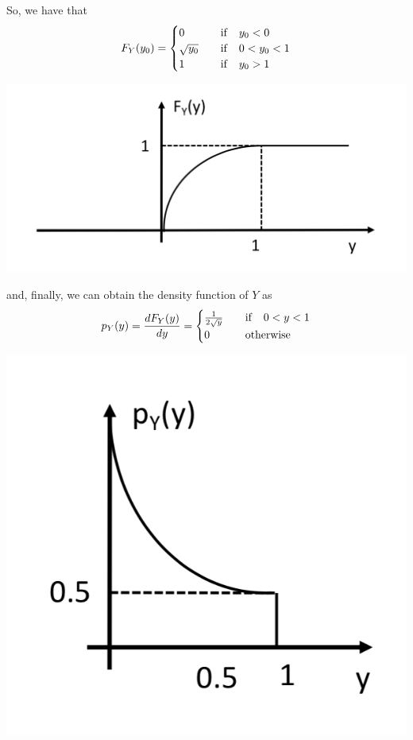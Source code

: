 So, we have that
\begin{eqnarray} 
F_Y(y_0) =\begin{cases}
 0 & \quad {\rm if} \quad y_0 <0 \\
 \sqrt{y_0} & \quad {\rm if} \quad 0< y_0 <1 \\
 1 & \quad {\rm if} \quad y_0 >1 \\
\end{cases}  \nonumber
\end{eqnarray} 
\begin{center}
\includegraphics[scale=.4]{Figures/Fig13.png}
\end{center}
and, finally, we can obtain the density function of $Y$ as
\begin{eqnarray} 
p_Y(y) = \frac{d F_Y(y)}{dy} =\begin{cases}
 \frac{1}{2\sqrt{y}} & \quad {\rm if} \quad 0<y<1 \\
 0 & \quad {\rm otherwise}  \\
\end{cases}  \nonumber
\end{eqnarray} 
\begin{center}
\includegraphics[scale=.4]{Figures/Fig14.png}
\end{center}
